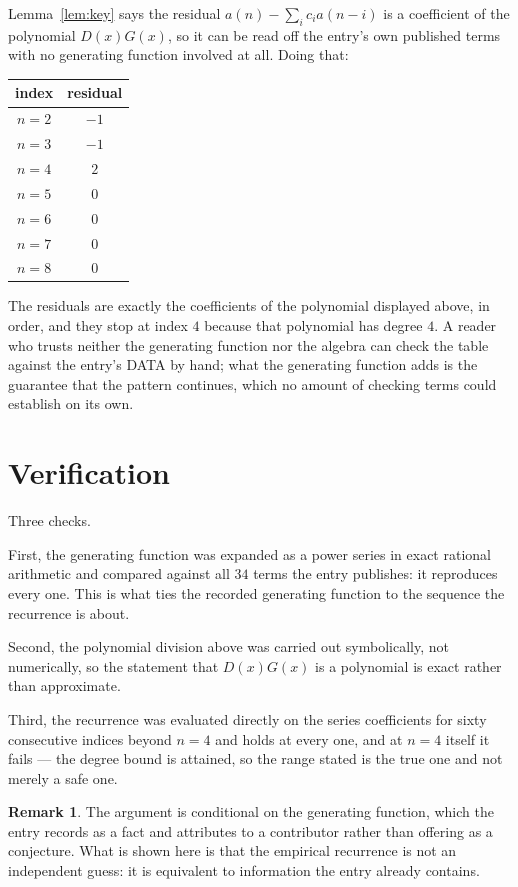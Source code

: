 \documentclass[11pt,a4paper]{article}
\theoremstyle{plain}
\theoremstyle{definition}
\newtheorem{remark}[theorem]{Remark}
\begin{document}
Lemma~\ref{lem:key} says the residual $a(n)-\sum_ic_ia(n-i)$ is a coefficient of the
polynomial $D(x)G(x)$, so it can be read off the entry's own published terms with no
generating function involved at all. Doing that:
\begin{center}
\begin{tabular}{cc}
index & residual \\ \hline
$n=2$ & $-1$ \\
$n=3$ & $-1$ \\
$n=4$ & $2$ \\
$n=5$ & $0$ \\
$n=6$ & $0$ \\
$n=7$ & $0$ \\
$n=8$ & $0$
\end{tabular}
\end{center}
The residuals are exactly the coefficients of the polynomial displayed above, in order, and
they stop at index $4$ because that polynomial has degree $4$. A reader who trusts
neither the generating function nor the algebra can check the table against the entry's DATA
by hand; what the generating function adds is the guarantee that the pattern continues, which
no amount of checking terms could establish on its own.

\section{Verification}

Three checks.

First, the generating function was expanded as a power series in exact rational arithmetic and
compared against all $34$ terms the entry publishes: it reproduces every one. This is
what ties the recorded generating function to the sequence the recurrence is about.

Second, the polynomial division above was carried out symbolically, not numerically, so the
statement that $D(x)G(x)$ is a polynomial is exact rather than approximate.

Third, the recurrence was evaluated directly on the series coefficients for sixty consecutive
indices beyond $n=4$ and holds at every one, and at $n=4$ itself it fails --- the
degree bound is attained, so the range stated is the true one and not merely a safe one.

\begin{remark}
The argument is conditional on the generating function, which the entry records as a fact and
attributes to a contributor rather than offering as a conjecture. What is shown here is that
the empirical recurrence is not an independent guess: it is equivalent to information the
entry already contains.
\end{remark}
\end{document}
